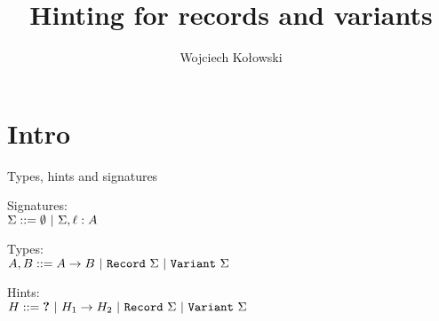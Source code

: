 \documentclass{beamer}
\title{Hinting for records and variants}
\author{Wojciech Kołowski}
\date{}
\begin{document}
\frame{\titlepage}

\section{Intro}

\newcommand{\emptysig}{\emptyset}
\newcommand{\extendsig}[3]{#1, #2 : #3}
\newcommand{\funsig}[2]{#1 \to #2}

\newcommand{\sigok}[1]{#1\ \texttt{ok}}

\newcommand{\Record}[1]{\texttt{Record}\ #1}
\newcommand{\Variant}[1]{\texttt{Variant}\ #1}

\begin{frame}{Types, hints and signatures}

Signatures: \\
$\Sigma ::= \emptysig \pipe \extendsig{\Sigma}{\ell}{A}$

\vspace{2em}

Types: \\
$A, B ::= \Fun{A}{B} \pipe \Record{\Sigma} \pipe \Variant{\Sigma}$

\vspace{2em}

Hints: \\
$H ::= \Hole \pipe \Fun{H_1}{H_2} \pipe \Record{\Sigma} \pipe \Variant{\Sigma}$

\end{frame}

\newcommand{\emptyrecord}{\{\}}
\newcommand{\extendrecord}[3]{\{#1, #2 := #3\}}
\newcommand{\proj}[2]{#1.#2}

\newcommand{\cons}[2]{#1\ #2}
\newcommand{\vcase}[2]{\texttt{vcase}\ #1\ \texttt{of}\ #2}

\newcommand{\recordtype}[1]{\{#1\}}
\newcommand{\record}[1]{\{#1\}}

\newcommand{\recordtypes}[4]{\recordtype{#1_{#3} : #2_{#3}}_{#3 \in #4}}
\newcommand{\records}[4]{\record{#1_{#3} := #2_{#3}}_{#3 \in #4}}

\newcommand{\varianttype}[1]{\left[#1\right]}
\newcommand{\varianttypes}[4]{\varianttype{#1_{#3} : #2_{#3}}_{#3 \in #4}}
\end{document}
